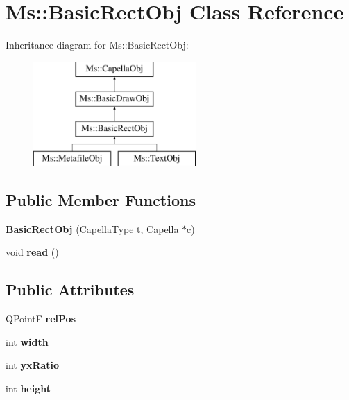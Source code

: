 \hypertarget{class_ms_1_1_basic_rect_obj}{}\section{Ms\+:\+:Basic\+Rect\+Obj Class Reference}
\label{class_ms_1_1_basic_rect_obj}
Inheritance diagram for Ms\+:\+:Basic\+Rect\+Obj\+:\begin{figure}[H]
\begin{center}
\leavevmode
\includegraphics[height=4.000000cm]{class_ms_1_1_basic_rect_obj}
\end{center}
\end{figure}
\subsection*{Public Member Functions}
\begin{DoxyCompactItemize}
\item 
\mbox{\label{class_ms_1_1_basic_rect_obj_a4173aabdd619a55a95f229c04c66028c}} 
{\bfseries Basic\+Rect\+Obj} (Capella\+Type t, \hyperlink{class_ms_1_1_capella}{Capella} $\ast$c)
\item 
\mbox{\label{class_ms_1_1_basic_rect_obj_aa94c5436471b0163535a9cf588371dde}} 
void {\bfseries read} ()
\end{DoxyCompactItemize}
\subsection*{Public Attributes}
\begin{DoxyCompactItemize}
\item 
\mbox{\label{class_ms_1_1_basic_rect_obj_abfd5890187814e3b67e7e3eb665bc170}} 
Q\+PointF {\bfseries rel\+Pos}
\item 
\mbox{\label{class_ms_1_1_basic_rect_obj_ad501d8343b5dbf735b620c6cfc793ea5}} 
int {\bfseries width}
\item 
\mbox{\label{class_ms_1_1_basic_rect_obj_a5232bd299dbb7eedfd31c0b7531b0909}} 
int {\bfseries yx\+Ratio}
\item 
\mbox{\label{class_ms_1_1_basic_rect_obj_a2da9af5486a9dbd966830f8954acdc96}} 
int {\bfseries height}
\end{DoxyCompactItemize}
